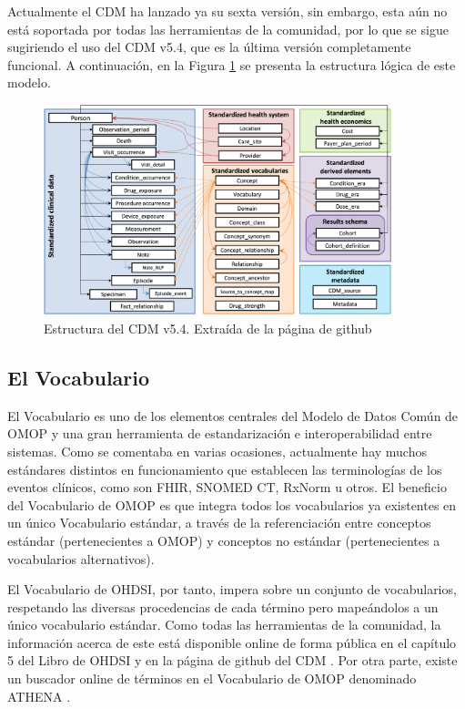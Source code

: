 Actualmente el CDM ha lanzado ya su sexta versión, sin embargo, esta aún no está soportada por todas las herramientas de la comunidad, por lo que se sigue sugiriendo el uso del CDM v5.4, que es la última versión completamente funcional. A continuación, en la Figura \ref{fig:cdm54} se presenta la estructura lógica de este modelo.

\begin{figure}[H]
    \centering
    \includegraphics[width=0.90\textwidth]{figures/cdm54.png}
     \caption{Estructura del CDM v5.4. Extraída de la página de github \cite{gitPagesCMD}}
    \label{fig:cdm54}
\end{figure}


\subsection{El Vocabulario}\label{subsec:05vocab}

El Vocabulario es uno de los elementos centrales del Modelo de Datos Común de OMOP y una gran herramienta de estandarización e interoperabilidad entre sistemas. Como se comentaba en varias ocasiones, actualmente hay muchos estándares distintos en funcionamiento que establecen las terminologías de los eventos clínicos, como son FHIR, SNOMED CT, RxNorm u otros. El beneficio del Vocabulario de OMOP es que integra todos los vocabularios ya existentes en un único Vocabulario estándar, a través de la referenciación entre conceptos estándar (pertenecientes a OMOP) y conceptos no estándar (pertenecientes a vocabularios alternativos).

El Vocabulario de OHDSI, por tanto, impera sobre un conjunto de vocabularios, respetando las diversas procedencias de cada término pero mapeándolos a un único vocabulario estándar.  Como todas las herramientas de la comunidad, la información acerca de este está disponible online de forma pública en el capítulo 5 del Libro de OHDSI \cite{OHDSIbook} y en la página de github del CDM \cite{gitPagesCMD}. Por otra parte, existe un buscador online de términos en el Vocabulario de OMOP denominado ATHENA \cite{ATHENAweb}. 


